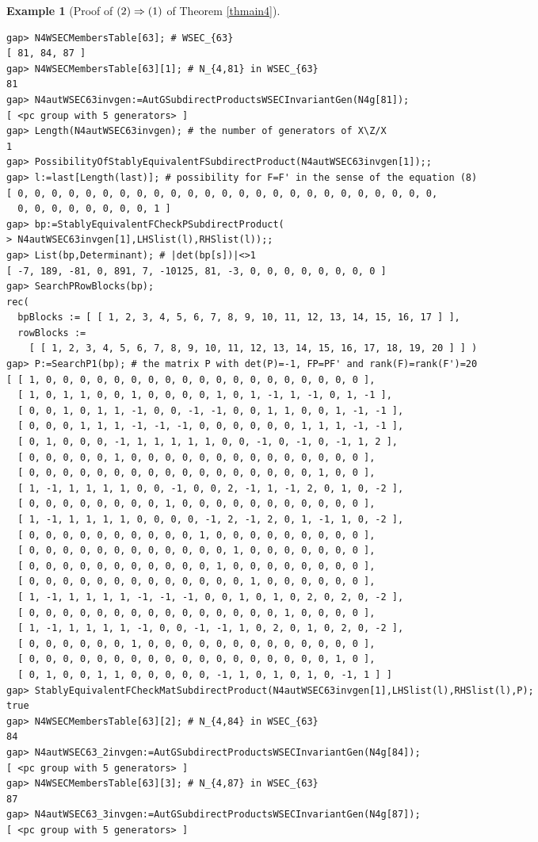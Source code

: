 \documentclass{amsart}
\theoremstyle{plain}
\theoremstyle{definition}
\newtheorem{example}[theorem]{Example}
\theoremstyle{remark}
\begin{document}
\begin{example}[Proof of ${\rm (2)}\Rightarrow {\rm (1)}$ of {Theorem \ref{thmain4}}]
\begin{verbatim}
gap> N4WSECMembersTable[63]; # WSEC_{63}
[ 81, 84, 87 ]
gap> N4WSECMembersTable[63][1]; # N_{4,81} in WSEC_{63}
81
gap> N4autWSEC63invgen:=AutGSubdirectProductsWSECInvariantGen(N4g[81]);
[ <pc group with 5 generators> ]
gap> Length(N4autWSEC63invgen); # the number of generators of X\Z/X
1
gap> PossibilityOfStablyEquivalentFSubdirectProduct(N4autWSEC63invgen[1]);;
gap> l:=last[Length(last)]; # possibility for F=F' in the sense of the equation (8)
[ 0, 0, 0, 0, 0, 0, 0, 0, 0, 0, 0, 0, 0, 0, 0, 0, 0, 0, 0, 0, 0, 0, 0, 0, 0, 
  0, 0, 0, 0, 0, 0, 0, 0, 1 ]
gap> bp:=StablyEquivalentFCheckPSubdirectProduct(
> N4autWSEC63invgen[1],LHSlist(l),RHSlist(l));;
gap> List(bp,Determinant); # |det(bp[s])|<>1
[ -7, 189, -81, 0, 891, 7, -10125, 81, -3, 0, 0, 0, 0, 0, 0, 0, 0 ]
gap> SearchPRowBlocks(bp);
rec( 
  bpBlocks := [ [ 1, 2, 3, 4, 5, 6, 7, 8, 9, 10, 11, 12, 13, 14, 15, 16, 17 ] ], 
  rowBlocks := 
    [ [ 1, 2, 3, 4, 5, 6, 7, 8, 9, 10, 11, 12, 13, 14, 15, 16, 17, 18, 19, 20 ] ] )
gap> P:=SearchP1(bp); # the matrix P with det(P)=-1, FP=PF' and rank(F)=rank(F')=20
[ [ 1, 0, 0, 0, 0, 0, 0, 0, 0, 0, 0, 0, 0, 0, 0, 0, 0, 0, 0, 0 ], 
  [ 1, 0, 1, 1, 0, 0, 1, 0, 0, 0, 0, 1, 0, 1, -1, 1, -1, 0, 1, -1 ], 
  [ 0, 0, 1, 0, 1, 1, -1, 0, 0, -1, -1, 0, 0, 1, 1, 0, 0, 1, -1, -1 ], 
  [ 0, 0, 0, 1, 1, 1, -1, -1, -1, 0, 0, 0, 0, 0, 0, 1, 1, 1, -1, -1 ], 
  [ 0, 1, 0, 0, 0, -1, 1, 1, 1, 1, 1, 0, 0, -1, 0, -1, 0, -1, 1, 2 ], 
  [ 0, 0, 0, 0, 0, 1, 0, 0, 0, 0, 0, 0, 0, 0, 0, 0, 0, 0, 0, 0 ], 
  [ 0, 0, 0, 0, 0, 0, 0, 0, 0, 0, 0, 0, 0, 0, 0, 0, 0, 1, 0, 0 ], 
  [ 1, -1, 1, 1, 1, 1, 0, 0, -1, 0, 0, 2, -1, 1, -1, 2, 0, 1, 0, -2 ], 
  [ 0, 0, 0, 0, 0, 0, 0, 0, 1, 0, 0, 0, 0, 0, 0, 0, 0, 0, 0, 0 ], 
  [ 1, -1, 1, 1, 1, 1, 0, 0, 0, 0, -1, 2, -1, 2, 0, 1, -1, 1, 0, -2 ], 
  [ 0, 0, 0, 0, 0, 0, 0, 0, 0, 0, 1, 0, 0, 0, 0, 0, 0, 0, 0, 0 ], 
  [ 0, 0, 0, 0, 0, 0, 0, 0, 0, 0, 0, 0, 1, 0, 0, 0, 0, 0, 0, 0 ], 
  [ 0, 0, 0, 0, 0, 0, 0, 0, 0, 0, 0, 1, 0, 0, 0, 0, 0, 0, 0, 0 ], 
  [ 0, 0, 0, 0, 0, 0, 0, 0, 0, 0, 0, 0, 0, 1, 0, 0, 0, 0, 0, 0 ], 
  [ 1, -1, 1, 1, 1, 1, -1, -1, -1, 0, 0, 1, 0, 1, 0, 2, 0, 2, 0, -2 ], 
  [ 0, 0, 0, 0, 0, 0, 0, 0, 0, 0, 0, 0, 0, 0, 0, 1, 0, 0, 0, 0 ], 
  [ 1, -1, 1, 1, 1, 1, -1, 0, 0, -1, -1, 1, 0, 2, 0, 1, 0, 2, 0, -2 ], 
  [ 0, 0, 0, 0, 0, 0, 1, 0, 0, 0, 0, 0, 0, 0, 0, 0, 0, 0, 0, 0 ], 
  [ 0, 0, 0, 0, 0, 0, 0, 0, 0, 0, 0, 0, 0, 0, 0, 0, 0, 0, 1, 0 ], 
  [ 0, 1, 0, 0, 1, 1, 0, 0, 0, 0, 0, -1, 1, 0, 1, 0, 1, 0, -1, 1 ] ]
gap> StablyEquivalentFCheckMatSubdirectProduct(N4autWSEC63invgen[1],LHSlist(l),RHSlist(l),P);
true
gap> N4WSECMembersTable[63][2]; # N_{4,84} in WSEC_{63}
84
gap> N4autWSEC63_2invgen:=AutGSubdirectProductsWSECInvariantGen(N4g[84]);
[ <pc group with 5 generators> ]
gap> N4WSECMembersTable[63][3]; # N_{4,87} in WSEC_{63}
87
gap> N4autWSEC63_3invgen:=AutGSubdirectProductsWSECInvariantGen(N4g[87]);
[ <pc group with 5 generators> ]


\end{verbatim}
\end{example}
\end{document}
